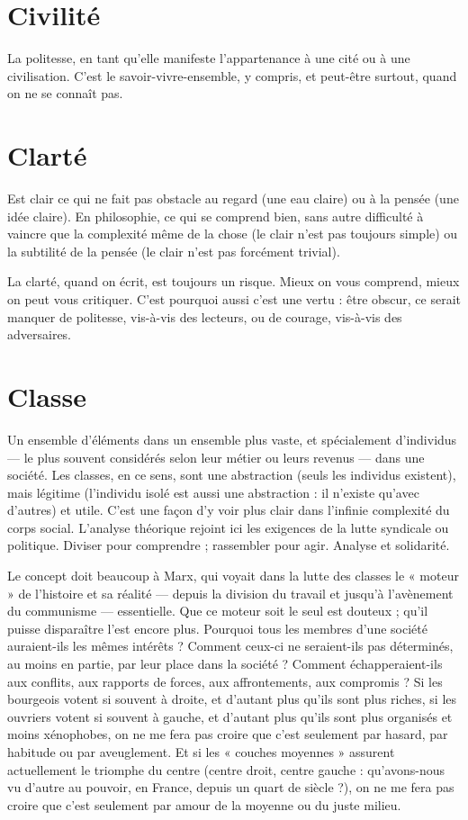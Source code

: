 \section{Civilité}
La politesse, en tant qu’elle manifeste l’appartenance à une cité
ou à une civilisation. C’est le savoir-vivre-ensemble, y compris,
et peut-être surtout, quand on ne se connaît pas.

\section{Clarté}
Est clair ce qui ne fait pas obstacle au regard (une eau claire) ou à
la pensée (une idée claire). En philosophie, ce qui se comprend
bien, sans autre difficulté à vaincre que la complexité même de la chose (le clair
n’est pas toujours simple) ou la subtilité de la pensée (le clair n’est pas forcément trivial).

La clarté, quand on écrit, est toujours un risque. Mieux on vous comprend,
mieux on peut vous critiquer. C’est pourquoi aussi c’est une vertu : être obscur,
ce serait manquer de politesse, vis-à-vis des lecteurs, ou de courage, vis-à-vis des
adversaires.

\section{Classe}
Un ensemble d’éléments dans un ensemble plus vaste, et spécialement
d’individus — le plus souvent considérés selon leur métier ou
leurs revenus — dans une société. Les classes, en ce sens, sont une abstraction
(seuls les individus existent), mais légitime (l'individu isolé est aussi une
abstraction : il n’existe qu'avec d’autres) et utile. C’est une façon d’y voir plus
clair dans l’infinie complexité du corps social. L'analyse théorique rejoint ici les
exigences de la lutte syndicale ou politique. Diviser pour comprendre ; rassembler
pour agir. Analyse et solidarité.

Le concept doit beaucoup à Marx, qui voyait dans la lutte des classes le
« moteur » de l’histoire et sa réalité — depuis la division du travail et jusqu’à
l'avènement du communisme — essentielle. Que ce moteur soit le seul est
douteux ; qu’il puisse disparaître l’est encore plus. Pourquoi tous les membres
d’une société auraient-ils les mêmes intérêts ? Comment ceux-ci ne seraient-ils
pas déterminés, au moins en partie, par leur place dans la société ? Comment
échapperaient-ils aux conflits, aux rapports de forces, aux affrontements, aux
compromis ? Si les bourgeois votent si souvent à droite, et d’autant plus qu’ils
sont plus riches, si les ouvriers votent si souvent à gauche, et d’autant plus
qu’ils sont plus organisés et moins xénophobes, on ne me fera pas croire que
c’est seulement par hasard, par habitude ou par aveuglement. Et si les « couches
moyennes » assurent actuellement le triomphe du centre (centre droit, centre
gauche : qu’avons-nous vu d’autre au pouvoir, en France, depuis un quart de
siècle ?), on ne me fera pas croire que c’est seulement par amour de la moyenne
ou du juste milieu.

